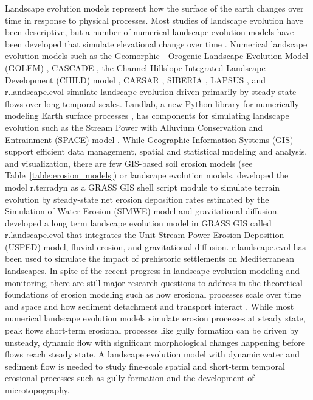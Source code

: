 \documentclass[gmd, manuscript]{copernicus}
\begin{document}
\introduction
Landscape evolution models represent how the surface of the earth changes 
over time in response to physical processes. 
Most studies of landscape evolution have been descriptive, 
but a number of numerical landscape evolution models 
have been developed that simulate elevational change over time 
\citep{Tucker2010,Temme2013}. 
Numerical landscape evolution models such as the 
Geomorphic - Orogenic Landscape Evolution Model (GOLEM) 
\citep{Tucker1994},
CASCADE \citep{Braun1997},
the Channel-Hillslope Integrated Landscape Development (CHILD) model 
\citep{Tucker2001},
CAESAR \citep{Coulthard2002,Coulthard2012},
SIBERIA \citep{Willgoose2005},
LAPSUS \citep{Schoorl2000,Schoorl2002},
and r.landscape.evol \citep{Barton2010}
simulate landscape evolution driven primarily by steady state flows over long temporal scales.
\href{http://landlab.github.io/}{Landlab},
a new Python library for numerically modeling Earth surface processes
\citep{Hobley2017},
has components for simulating landscape evolution such as the 
Stream Power with Alluvium Conservation and Entrainment (SPACE) 
model \citep{Shobe2017}.
While Geographic Information Systems (GIS)
support efficient data management, 
spatial and statistical modeling and analysis, 
and visualization,
there are few GIS-based soil erosion models (see Table~\ref{table:erosion_models})
or landscape evolution models.
\cite{Thaxton2004} developed the model r.terradyn as a GRASS GIS shell script module 
to simulate terrain evolution by steady-state net erosion deposition rates
estimated by the Simulation of Water Erosion (SIMWE) model \citep{Mitas1998}
and gravitational diffusion. 
\cite{Barton2010} developed a long term landscape evolution model
in GRASS GIS called r.landscape.evol that integrates 
the Unit Stream Power Erosion Deposition (USPED) model,
fluvial erosion, and gravitational diffusion.
r.landscape.evol has been used to simulate the impact 
of prehistoric settlements on Mediterranean landscapes.
In spite of the recent progress in landscape evolution modeling and monitoring, 
there are still major research questions 
to address in the theoretical foundations of erosion modeling 
such as how erosional processes scale over time and space 
and how sediment detachment and transport interact \citep{Mitasova2013}. 
While most numerical landscape evolution models 
simulate erosion processes at steady state, peak flows
short-term erosional processes like gully formation can be driven by unsteady, dynamic flow
with significant morphological changes happening before flows reach steady state. 
A landscape evolution model with dynamic water and sediment flow
is needed to study fine-scale spatial and short-term temporal erosional processes
such as gully formation and the development of microtopography. 
\end{document}
